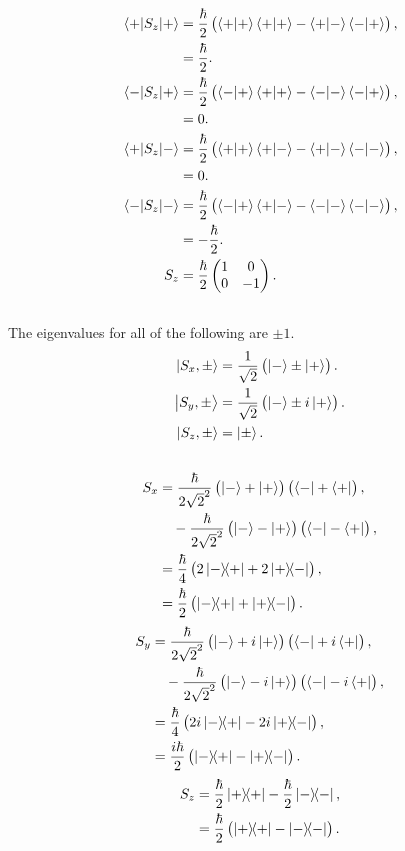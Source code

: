 \documentclass[
a4paper,
10pt,
twoside,
]{article}
\begin{document}
\begin{align}
	\mel{+}{S_z}{+} &= \frac{\hbar}{2} \left(\ip{+}{+}\ip{+}{+} - \ip{+}{-}\ip{-}{+} \right),\\
	&= \frac{\hbar}{2}.\\
	\mel{-}{S_z}{+} &= \frac{\hbar}{2} \left(\ip{-}{+}\ip{+}{+} - \ip{-}{-}\ip{-}{+} \right),\\
	&= 0.\\
	\mel{+}{S_z}{-} &= \frac{\hbar}{2} \left(\ip{+}{+}\ip{+}{-} - \ip{+}{-}\ip{-}{-} \right),\\
	&= 0.\\
	\mel{-}{S_z}{-} &= \frac{\hbar}{2} \left(\ip{-}{+}\ip{+}{-} - \ip{-}{-}\ip{-}{-} \right),\\
	&= -\frac{\hbar}{2}.\\
	S_z &= \frac{\hbar}{2}\begin{pmatrix}
		1&0\\0&-1
	\end{pmatrix}.
\end{align}

\subsection{}%
The eigenvalues for all of the following are $\pm 1$.
\begin{align}
	\ket{S_x,\pm} &= \frac{1}{\sqrt{2}} \left(\ket{-}\pm\ket{+}\right).\\
	\ket{S_y,\pm} &= \frac{1}{\sqrt{2}} \left(\ket{-}\pm i\ket{+}\right).\\
	\ket{S_z,\pm} &= \ket{\pm}.
\end{align}

\subsection{}%
\begin{align}
	S_x &= \frac{\hbar}{2\sqrt{2}^2} \left(\ket{-}+\ket{+}\right)\left(\bra{-}+\bra{+}\right),\\
	&\quad- \frac{\hbar}{2\sqrt{2}^2} \left(\ket{-}-\ket{+}\right)\left(\bra{-}-\bra{+}\right),\\
	&= \frac{\hbar}{4}\left( 2\op{-}{+}+2\op{+}{-}\right),\\
	&= \frac{\hbar}{2}\left(\op{-}{+}+\op{+}{-}\right).
\end{align}
\begin{align}
	S_y &= \frac{\hbar}{2\sqrt{2}^2} \left(\ket{-}+i\ket{+}\right)\left(\bra{-}+i\bra{+}\right),\\
	&\quad- \frac{\hbar}{2\sqrt{2}^2} \left(\ket{-}-i\ket{+}\right)\left(\bra{-}-i\bra{+}\right),\\
	&= \frac{\hbar}{4}\left( 2i\op{-}{+}-2i\op{+}{-}\right),\\
	&= \frac{i\hbar}{2}\left(\op{-}{+}-\op{+}{-}\right).
\end{align}
\begin{align}
	S_z &= \frac{\hbar}{2} \op{+} - \frac{\hbar}{2}\op{-},\\
	&= \frac{\hbar}{2} \left(\op{+} - \op{-}\right).
\end{align}
\end{document}
